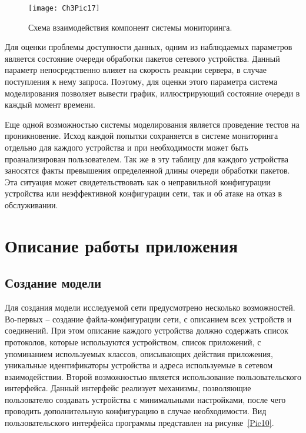      \begin{figure}[h!]\center
        \texttt{[image: Ch3Pic17]}
        \caption{Схема взаимодействия компонент системы мониторинга. } \label{Pic17}
    \end{figure}

    Для оценки проблемы доступности данных, одним из наблюдаемых параметров является состояние очереди обработки пакетов сетевого устройства. Данный параметр непосредственно влияет на скорость реакции сервера, в случае поступления к нему запроса. Поэтому, для оценки этого параметра система моделирования позволяет вывести график, иллюстрирующий состояние очереди в каждый момент времени.

    Еще одной возможностью системы моделирования является проведение тестов на проникновение. Исход каждой попытки сохраняется в системе мониторинга отдельно для каждого устройства и при необходимости может быть проанализирован пользователем. Так же в эту таблицу для каждого устройства заносятся факты превышения определенной длины очереди обработки пакетов. Эта ситуация может свидетельствовать как о неправильной конфигурации устройства или неэффективной конфигурации сети, так и об атаке на отказ в обслуживании.



    \section{Описание работы приложения}

    \subsection{Создание модели}

    Для создания модели исследуемой сети предусмотрено несколько возможностей. Во-первых -- создание файла-конфигурации сети, с описанием всех устройств и соединений. При этом описание каждого устройства должно содержать список протоколов, которые используются устройством,  список приложений, с упоминанием используемых классов, описывающих действия приложения, уникальные идентификаторы устройства и адреса используемые в сетевом взаимодействии. Второй возможностью является использование пользовательского интерфейса. Данный интерфейс реализует механизмы, позволяющие пользователю создавать устройства с минимальными настройками, после чего проводить дополнительную конфигурацию в случае необходимости. Вид пользовательского интерфейса программы представлен на рисунке~\ref{Pic10}.

